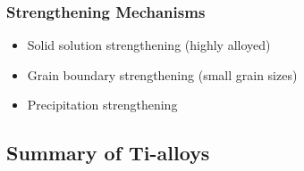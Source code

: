 \subsubsection{Strengthening Mechanisms} %
\label{ssub:strengthening_mechanisms}
\begin{itemize}
  \item Solid solution strengthening (highly alloyed)
  \item Grain boundary strengthening (small grain sizes)
  \item Precipitation strengthening
\end{itemize}


\subsection{Summary of Ti-alloys} %
\label{sub:summary_of_ti_alloys}





